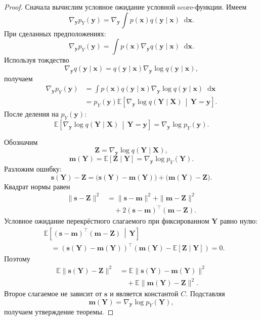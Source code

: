 \documentclass[12pt,a4paper]{article}
\theoremstyle{definition}
\newcommand{\E}{\mathbb{E}}
\newcommand{\given}{\,\middle|\,}
\newcommand{\dd}{\mathop{}\!\mathrm{d}}
\newcommand{\1}{\mathbf{1}}
\begin{document}
\begin{proof}
Сначала вычислим условное ожидание условной score-функции. Имеем
\[
    \nabla_{\bm{y}}p_Y(\bm{y})
    =
    \nabla_{\bm{y}}
    \int
    p(\bm{x})q(\bm{y}\mid\bm{x})
    \dd\bm{x}.
\]
При сделанных предположениях:
\[
    \nabla_{\bm{y}}p_Y(\bm{y})
    =
    \int
    p(\bm{x})
    \nabla_{\bm{y}}q(\bm{y}\mid\bm{x})
    \dd\bm{x}.
\]
Используя тождество
\[
    \nabla_{\bm{y}}q(\bm{y}\mid\bm{x})
    =
    q(\bm{y}\mid\bm{x})
    \nabla_{\bm{y}}\log q(\bm{y}\mid\bm{x}),
\]
получаем
\begin{align*}
    \nabla_{\bm{y}}p_Y(\bm{y})
    &=
    \int
    p(\bm{x})q(\bm{y}\mid\bm{x})
    \nabla_{\bm{y}}\log q(\bm{y}\mid\bm{x})
    \dd\bm{x}\\
    &=
    p_Y(\bm{y})
    \E\left[
        \nabla_{\bm{y}}\log q(\bm{Y}\mid\bm{X})
        \given
        \bm{Y}=\bm{y}
    \right].
\end{align*}
После деления на $p_Y(\bm{y})$:
\[
    \E\left[
        \nabla_{\bm{y}}\log q(\bm{Y}\mid\bm{X})
        \given
        \bm{Y}=\bm{y}
    \right]
    =
    \nabla_{\bm{y}}\log p_Y(\bm{y}).
\]

Обозначим
\[
    \bm{Z}
    =
    \nabla_{\bm{y}}\log q(\bm{Y}\mid\bm{X}),
\]
\[
    \bm{m}(\bm{Y})
    =
    \E[\bm{Z}\mid\bm{Y}]
    =
    \nabla_{\bm{y}}\log p_Y(\bm{Y}).
\]
Разложим ошибку:
\[
    \bm{s}(\bm{Y})-\bm{Z}
    =
    \bigl(\bm{s}(\bm{Y})-\bm{m}(\bm{Y})\bigr)
    +
    \bigl(\bm{m}(\bm{Y})-\bm{Z}\bigr).
\]
Квадрат нормы равен
\begin{align*}
    \|\bm{s}-\bm{Z}\|^2
    &=
    \|\bm{s}-\bm{m}\|^2
    +
    \|\bm{m}-\bm{Z}\|^2\\
    &\quad+
    2(\bm{s}-\bm{m})^\top(\bm{m}-\bm{Z}).
\end{align*}
Условное ожидание перекрёстного слагаемого при фиксированном $\bm{Y}$
равно нулю:
\begin{align*}
    &\E\left[
        (\bm{s}-\bm{m})^\top(\bm{m}-\bm{Z})
        \given \bm{Y}
    \right]\\
    &\quad=
    (\bm{s}(\bm{Y})-\bm{m}(\bm{Y}))^\top
    \left(
        \bm{m}(\bm{Y})
        -
        \E[\bm{Z}\mid\bm{Y}]
    \right)
    =0.
\end{align*}
Поэтому
\begin{align*}
    \E\|\bm{s}(\bm{Y})-\bm{Z}\|^2
    &=
    \E\|\bm{s}(\bm{Y})-\bm{m}(\bm{Y})\|^2\\
    &\quad+
    \E\|\bm{m}(\bm{Y})-\bm{Z}\|^2.
\end{align*}
Второе слагаемое не зависит от $\bm{s}$ и является константой $C$.
Подставляя
\[
    \bm{m}(\bm{Y})
    =
    \nabla_{\bm{y}}\log p_Y(\bm{Y}),
\]
получаем утверждение теоремы.
\end{proof}
\end{document}
